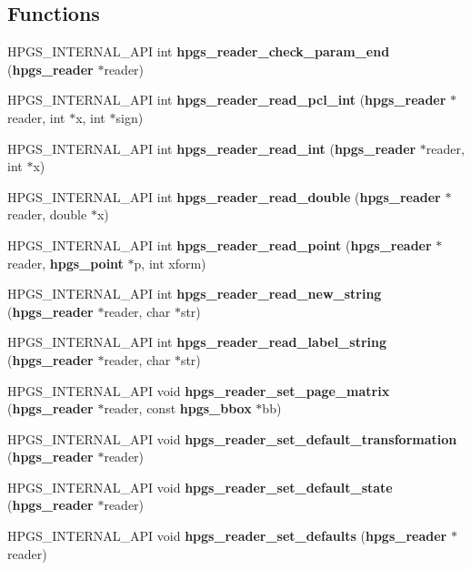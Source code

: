 \subsection*{Functions}
\begin{DoxyCompactItemize}
\item 
HPGS\_\-INTERNAL\_\-API int {\bfseries hpgs\_\-reader\_\-check\_\-param\_\-end} ({\bf hpgs\_\-reader} $\ast$reader)\label{group__reader_gafd6d559ddde9821fdb9664ed9b350437}

\item 
HPGS\_\-INTERNAL\_\-API int {\bf hpgs\_\-reader\_\-read\_\-pcl\_\-int} ({\bf hpgs\_\-reader} $\ast$reader, int $\ast$x, int $\ast$sign)
\item 
HPGS\_\-INTERNAL\_\-API int {\bf hpgs\_\-reader\_\-read\_\-int} ({\bf hpgs\_\-reader} $\ast$reader, int $\ast$x)
\item 
HPGS\_\-INTERNAL\_\-API int {\bf hpgs\_\-reader\_\-read\_\-double} ({\bf hpgs\_\-reader} $\ast$reader, double $\ast$x)
\item 
HPGS\_\-INTERNAL\_\-API int {\bfseries hpgs\_\-reader\_\-read\_\-point} ({\bf hpgs\_\-reader} $\ast$reader, {\bf hpgs\_\-point} $\ast$p, int xform)\label{group__reader_gaf2f8dd795fe271aaa65b18b76411c74c}

\item 
HPGS\_\-INTERNAL\_\-API int {\bf hpgs\_\-reader\_\-read\_\-new\_\-string} ({\bf hpgs\_\-reader} $\ast$reader, char $\ast$str)
\item 
HPGS\_\-INTERNAL\_\-API int {\bfseries hpgs\_\-reader\_\-read\_\-label\_\-string} ({\bf hpgs\_\-reader} $\ast$reader, char $\ast$str)\label{group__reader_ga5f24e8cf1310c401bc7fc8881f9a0879}

\item 
HPGS\_\-INTERNAL\_\-API void {\bfseries hpgs\_\-reader\_\-set\_\-page\_\-matrix} ({\bf hpgs\_\-reader} $\ast$reader, const {\bf hpgs\_\-bbox} $\ast$bb)\label{group__reader_ga72c7fa4b8ac9145ebb61135d472bc9c9}

\item 
HPGS\_\-INTERNAL\_\-API void {\bfseries hpgs\_\-reader\_\-set\_\-default\_\-transformation} ({\bf hpgs\_\-reader} $\ast$reader)\label{group__reader_gaf1fb3505e9053168ef9115846a28fec5}

\item 
HPGS\_\-INTERNAL\_\-API void {\bfseries hpgs\_\-reader\_\-set\_\-default\_\-state} ({\bf hpgs\_\-reader} $\ast$reader)\label{group__reader_gabfe55a98e961170ac6d21984de801f1b}

\item 
HPGS\_\-INTERNAL\_\-API void {\bfseries hpgs\_\-reader\_\-set\_\-defaults} ({\bf hpgs\_\-reader} $\ast$reader)\label{group__reader_ga82d8ec9da507f8560f50120db8f2cc05}


\end{DoxyCompactItemize}
